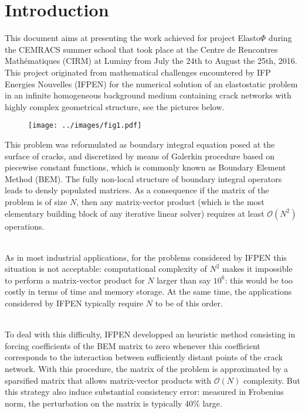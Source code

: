 \section*{Introduction}

This document aims at presenting the work achieved for project Elasto$\Phi$ during the CEMRACS summer school  
that took place at the Centre de Rencontres Mathématiques (CIRM) at Luminy from  July the 24th to 
August the 25th, 2016. This project originated from mathematical challenges encountered by IFP Energies Nouvelles (IFPEN)
for the numerical solution of an elastostatic problem in an infinite homogeneous background medium containing crack 
networks with highly complex geometrical structure, see the pictures below. 

\begin{figure}[h!]
\centerline{\texttt{[image: ../images/fig1.pdf]}}
\end{figure}


\noindent 
This problem was reformulated as boundary integral equation posed at the surface of cracks, and 
discretized by means of Galerkin procedure based on piecewise constant functions, which is commonly known as 
Boundary Element Method (BEM). The fully non-local structure of boundary integral operators leads to  
densly populated matrices. As a consequence if the matrix of the problem is of size $N$, 
then any matrix-vector product (which is the most elementary building block of any iterative linear solver)
requires at least $\mathcal{O}(N^{2})$ operations.

\quad\\
As in most industrial applications, for the problems considered by IFPEN this situation is not acceptable: 
computational complexity of $N^{2}$ makes it impossible to perform a matrix-vector product for $N$ larger than
say $10^{6}$: this would be too costly in terms of time and memory storage. At the same time, the  applications 
considered by IFPEN typically require $N$ to be of this order.

\quad\\
To deal with this difficulty, IFPEN developped  an heuristic method consisting in forcing coefficients of the 
BEM matrix to zero whenever this coefficient corresponds to the interaction between sufficiently distant points 
of the crack network. With this procedure, the matrix of the problem is approximated by a sparsified matrix that 
allows matrix-vector products with $\mathcal{O}(N)$ complexity. But this strategy also induce substantial consistency 
error: measured in Frobenius norm, the perturbation on the matrix is typically  40\% large.

